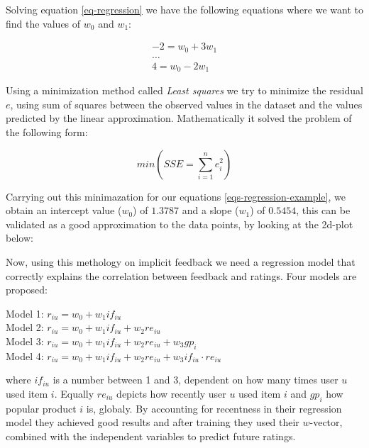 Solving equation \ref{eq-regression} we have the following equations where we
want to find the values of $w_0$ and $w_1$:

\begin{equation}
  \label{eqs-regression-example}
  \begin{split}
    -2 = w_0 + 3 w_1 \\
    \dots \\
    4 = w_0 - 2 w_1
  \end{split}
\end{equation}

Using a minimization method called \textit{Least squares} we try to minimize
the residual $e$, using sum of squares between the observed values in the
dataset and the values predicted by the linear approximation. Mathematically it
solved the problem of the following form:

\begin{equation}
  min (SSE = \sum_{i=1}^{n} e_i^2)
\end{equation}

Carrying out this minimazation for our equations \ref{eqs-regression-example},
we obtain an intercept value ($w_0$) of $1.3787$ and a slope ($w_1$) of
$0.5454$, this can be validated as a good approximation to the data points, by
looking at the 2d-plot below:


Now, using this methology on implicit feedback we need a regression model that
correctly explains the correlation between feedback and ratings. Four models
are proposed:

\noindent
Model 1: $r_{iu} = w_0 + w_1 if_{iu}$ \\
Model 2: $r_{iu} = w_0 + w_1 if_{iu} + w_2 re_{iu}$ \\
Model 3: $r_{iu} = w_0 + w_1 if_{iu} + w_2 re_{iu} + w_3 gp_{i}$ \\
Model 4: $r_{iu} = w_0 + w_1 if_{iu} + w_2 re_{iu} + w_3 if_{iu} \cdot re_{iu}$

where $if_{iu}$ is a number between 1 and 3, dependent on how many times user
$u$ used item $i$. Equally $re_{iu}$ depicts how recently user $u$ used item
$i$ and $gp_{i}$ how popular product $i$ is, globaly. By accounting for
recentness in their regression model they achieved good results and after
training they used their $w$-vector, combined with the independent variables to
predict future ratings. 

